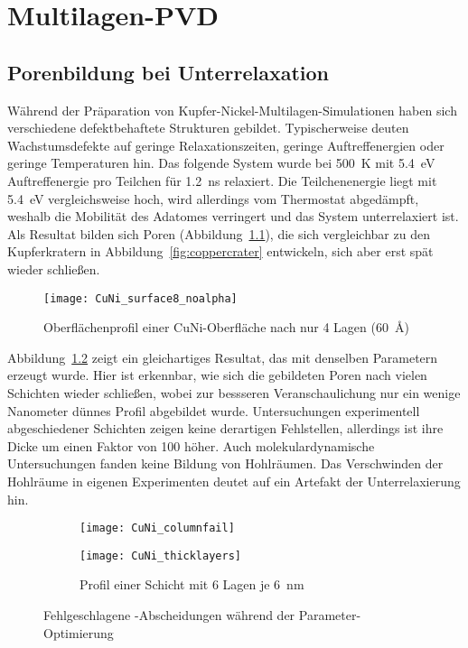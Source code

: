 \chapter{Multilagen-PVD}
\label{appendix_multilayer}

\section{Porenbildung bei Unterrelaxation}

Während der Präparation von Kupfer-Nickel-Multilagen-Simulationen haben sich verschiedene defektbehaftete Strukturen gebildet.
Typischerweise deuten Wachstumsdefekte auf geringe Relaxationszeiten, geringe Auftreffenergien oder geringe Temperaturen hin.
Das folgende System wurde bei \SI{500}{\kelvin} mit \SI{5.4}{\electronvolt} Auftreffenergie pro Teilchen für \SI{1.2}{\nano\second} relaxiert.
Die Teilchenenergie liegt mit \SI{5.4}{\electronvolt} vergleichsweise hoch\cite{zhou_atomistic_1998}, wird allerdings vom Thermostat abgedämpft, weshalb die Mobilität des Adatomes verringert und das System unterrelaxiert ist.
Als Resultat bilden sich Poren (Abbildung~\ref{fig:multilayer_surfacefail}), die sich vergleichbar zu den Kupferkratern in Abbildung~\ref{fig:coppercrater} entwickeln, sich aber erst spät wieder schließen.

\begin{figure}[H]
  \centering
  \texttt{[image: CuNi\_surface8\_noalpha]}
  \caption{Oberflächenprofil einer CuNi-Oberfläche nach nur 4 Lagen (\SI{60}{\angstrom})}
  \label{fig:multilayer_surfacefail}
\end{figure}

Abbildung~\ref{fig:multilayer_columnfail} zeigt ein gleichartiges Resultat, das mit denselben Parametern erzeugt wurde.
Hier ist erkennbar, wie sich die gebildeten Poren nach vielen Schichten wieder schließen, wobei zur bessseren Veranschaulichung nur ein wenige Nanometer dünnes Profil abgebildet wurde.
Untersuchungen experimentell abgeschiedener Schichten zeigen keine derartigen Fehlstellen\cite{yang_pulsed_1995}, allerdings ist ihre Dicke um einen Faktor von \num{100} höher.
Auch molekulardynamische Untersuchungen\cite{zhou_atomic_2001} fanden keine Bildung von Hohlräumen.
Das Verschwinden der Hohlräume in eigenen Experimenten deutet auf ein Artefakt der Unterrelaxierung hin.

\begin{figure}[!ht]
  \captionsetup[subfigure]{singlelinecheck=false}
  \def\subfigwidth{7cm}
  \begin{subfigure}[t]{\subfigwidth}
    \texttt{[image: CuNi\_columnfail]}
    \label{fig:multilayer_columnfail}
  \end{subfigure}
  \hfill
  \begin{subfigure}[t]{\subfigwidth}
    \texttt{[image: CuNi\_thicklayers]}
    \caption{Profil einer Schicht mit 6 Lagen je \SI{6}{\nano\meter}}
    \label{fig:multilayer_thickfail}
  \end{subfigure}
  \caption{Fehlgeschlagene -Abscheidungen während der Parameter-Optimierung}
\end{figure}

